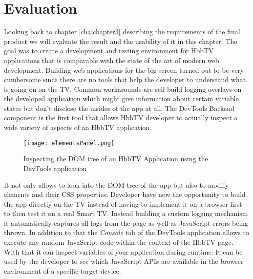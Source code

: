 
\chapter{Evaluation\label{cha:chapter6}}

Looking back to chapter \ref{cha:chapter3} describing the requirements of the final product we will
evaluate the result and the usability of it in this chapter. The goal was to create a development
and testing environment for HbbTV applications that is comparable with the state of the art of
modern web development. Building web applications for the big screen turned out to be very cumbersome
since there are no tools that help the developer to understand what is going on on the TV. Common
workarounds are self build logging overlays on the developed application which might give information
about certain variable states but don't disclose the insides of the app at all. The DevTools Backend
component is the first tool that allows HbbTV developer to actually inspect a wide variety of aspects
of an HbbTV application.

\begin{figure}[htb]
  \centering
  \hspace*{-0.7cm}
  \texttt{[image: elementsPanel.png]}\\
  \caption{Inspecting the DOM tree of an HbbTV Application using the DevTools application}\label{fig:elementsPanel}
\end{figure}

It not only allows to look into the DOM tree of the app but also to modify elements and their CSS
properties. Developer have now the opportunity to build the app directly on the TV instead of
having to implement it on a browser first to then test it on a real Smart TV. Instead building
a custom logging mechanism it automatically captures all logs from the page as well as JavaScript
errors being thrown. In addition to that the \textit{Console} tab of the DevTools application
allows to execute any random JavaScript code within the context of the HbbTV page. With that it
can inspect variables of your application during runtime. It can be used by the developer to see
which JavaScript APIs are available in the browser environment of a specific target device.

